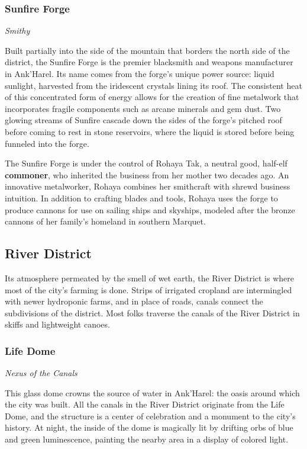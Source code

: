 \documentclass[letterpaper, 11pt, bg=full, twocolumn]{dndbook}
\begin{document}
\subsubsection{Sunfire Forge}

\textit{Smithy}

Built partially into the side of the mountain that borders the north side of the district, the Sunfire Forge is the premier blacksmith and weapons manufacturer in Ank'Harel. Its name comes from the forge's unique power source: liquid sunlight, harvested from the iridescent crystals lining its roof. The consistent heat of this concentrated form of energy allows for the creation of fine metalwork that incorporates fragile components such as arcane minerals and gem dust. Two glowing streams of Sunfire cascade down the sides of the forge's pitched roof before coming to rest in stone reservoirs, where the liquid is stored before being funneled into the forge.

The Sunfire Forge is under the control of Rohaya Tak, a neutral good, half-elf \textbf{commoner}, who inherited the business from her mother two decades ago. An innovative metalworker, Rohaya combines her smithcraft with shrewd business intuition. In addition to crafting blades and tools, Rohaya uses the forge to produce cannons for use on sailing ships and skyships, modeled after the bronze cannons of her family's homeland in southern Marquet.

\subsection{River District}

Its atmosphere permeated by the smell of wet earth, the River District is where most of the city's farming is done. Strips of irrigated cropland are intermingled with newer hydroponic farms, and in place of roads, canals connect the subdivisions of the district. Most folks traverse the canals of the River District in skiffs and lightweight canoes.

\subsubsection{Life Dome}

\textit{Nexus of the Canals}

This glass dome crowns the source of water in Ank'Harel: the oasis around which the city was built. All the canals in the River District originate from the Life Dome, and the structure is a center of celebration and a monument to the city's history. At night, the inside of the dome is magically lit by drifting orbs of blue and green luminescence, painting the nearby area in a display of colored light.
\end{document}
